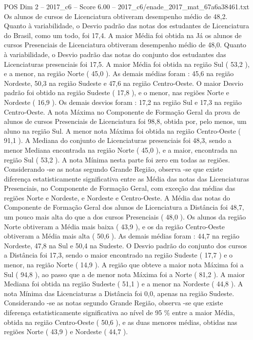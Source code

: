 \begin{textsample}{POS Dim 2 – 2017\_c6 – Score 6.00 – 2017\_c6/enade\_2017\_mat\_67a6a38461.txt}
Os alunos de cursos de Licenciatura obtiveram desempenho médio de 48,2.
Quanto à variabilidade, o Desvio padrão das notas dos estudantes de Licenciatura do Brasil, como um todo, foi 17,4.
A maior Média foi obtida na Já os alunos de cursos Presenciais de Licenciatura obtiveram desempenho médio de 48,0.
Quanto à variabilidade, o Desvio padrão das notas do conjunto dos estudantes das Licenciaturas presenciais foi 17,5.
A maior Média foi obtida na região Sul ( 53,2 ), e a menor, na região Norte ( 45,0 ).
As demais médias foram : 45,6 na região Nordeste, 50,3 na região Sudeste e 47,6 na região Centro-Oeste.
O maior Desvio padrão foi obtido na região Sudeste ( 17,8 ), e o menor, nas regiões Norte e Nordeste ( 16,9 ).
Os demais desvios foram : 17,2 na região Sul e 17,3 na região Centro-Oeste.
A nota Máxima no Componente de Formação Geral da prova de alunos de cursos Presenciais de Licenciatura foi 98,8, obtida por, pelo menos, um aluno na região Sul.
A menor nota Máxima foi obtida na região Centro-Oeste ( 91,1 ).
A Mediana do conjunto de Licenciaturas presenciais foi 48,3, sendo a menor Mediana encontrada na região Norte ( 45,0 ), e a maior, encontrada na região Sul ( 53,2 ).
A nota Mínima nesta parte foi zero em todas as regiões.
Considerando -se as notas segundo Grande Região, observa -se que existe diferença estatisticamente significativa entre as Média das notas das Licenciaturas Presenciais, no Componente de Formação Geral, com exceção das médias das regiões Norte e Nordeste, e Nordeste e Centro-Oeste.
A Média das notas do Componente de Formação Geral dos alunos de Licenciatura a Distância foi 48,7, um pouco mais alta do que a dos cursos Presenciais ( 48,0 ).
Os alunos da região Norte obtiveram a Média mais baixa ( 43,9 ), e os da região Centro-Oeste obtiveram a Média mais alta ( 50,6 ).
As demais médias foram : 44,7 na região Nordeste, 47,8 na Sul e 50,4 na Sudeste.
O Desvio padrão do conjunto dos cursos a Distância foi 17,3, sendo o maior encontrado na região Sudeste ( 17,7 ) e o menor, na região Norte ( 14,9 ).
A região que obteve a maior nota Máxima foi a Sul ( 94,8 ), ao passo que a de menor nota Máxima foi a Norte ( 81,2 ).
A maior Mediana foi obtida na região Sudeste ( 51,1 ) e a menor na Nordeste ( 44,8 ).
A nota Mínima das Licenciaturas a Distância foi 0,0, apenas na região Sudeste.
Considerando -se as notas segundo Grande Região, observa -se que existe diferença estatisticamente significativa ao nível de 95 \% entre a maior Média, obtida na região Centro-Oeste ( 50,6 ), e as duas menores médias, obtidas nas regiões Norte ( 43,9 ) e Nordeste ( 44,7 ).

\end{textsample}
